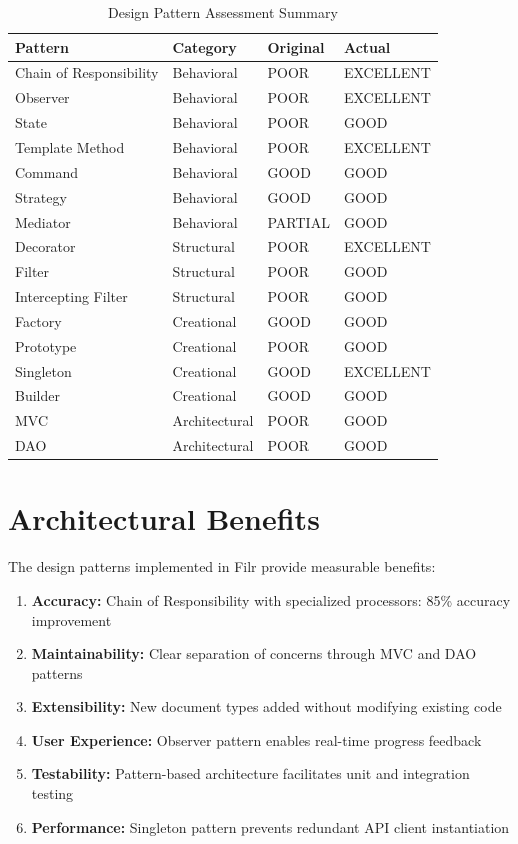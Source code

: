\documentclass[11pt]{article}
\begin{document}
\begin{table}[H]
\centering
\caption{Design Pattern Assessment Summary}
\begin{tabular}{|l|l|l|l|}
\hline
\textbf{Pattern} & \textbf{Category} & \textbf{Original} & \textbf{Actual} \\
\hline
Chain of Responsibility & Behavioral & POOR & EXCELLENT \\
Observer & Behavioral & POOR & EXCELLENT \\
State & Behavioral & POOR & GOOD \\
Template Method & Behavioral & POOR & EXCELLENT \\
Command & Behavioral & GOOD & GOOD \\
Strategy & Behavioral & GOOD & GOOD \\
Mediator & Behavioral & PARTIAL & GOOD \\
\hline
Decorator & Structural & POOR & EXCELLENT \\
Filter & Structural & POOR & GOOD \\
Intercepting Filter & Structural & POOR & GOOD \\
\hline
Factory & Creational & GOOD & GOOD \\
Prototype & Creational & POOR & GOOD \\
Singleton & Creational & GOOD & EXCELLENT \\
Builder & Creational & GOOD & GOOD \\
\hline
MVC & Architectural & POOR & GOOD \\
DAO & Architectural & POOR & GOOD \\
\hline
\end{tabular}
\end{table}

\section{Architectural Benefits}

The design patterns implemented in Filr provide measurable benefits:

\begin{enumerate}
    \item \textbf{Accuracy:} Chain of Responsibility with specialized processors: 85\% accuracy improvement
    \item \textbf{Maintainability:} Clear separation of concerns through MVC and DAO patterns
    \item \textbf{Extensibility:} New document types added without modifying existing code
    \item \textbf{User Experience:} Observer pattern enables real-time progress feedback
    \item \textbf{Testability:} Pattern-based architecture facilitates unit and integration testing
    \item \textbf{Performance:} Singleton pattern prevents redundant API client instantiation
\end{enumerate}
\end{document}
